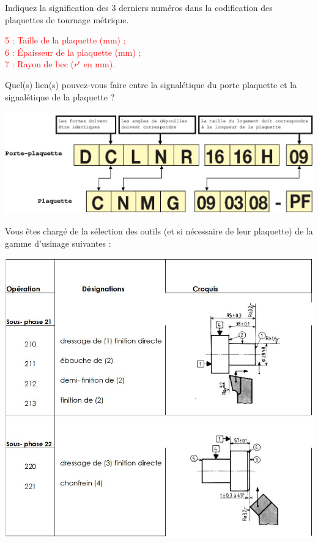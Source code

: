 \documentclass[12pt,a4paper]{article} %
\begin{document}
\begin{exo} Indiquez la signification des 3 derniers numéros dans la codification des plaquettes de tournage métrique. \end{exo}


\textcolor{red}{5 : Taille de la plaquette (mm) ; \\ 6 : Épaisseur de la plaquette (mm) ; \\ 7 : Rayon de bec ($r^{\epsilon}$ en mm).}



\begin{exo} Quel(s) lien(s) pouvez-vous faire entre la signalétique du porte plaquette et la signalétique de la plaquette ?\end{exo}

\includegraphics[width=0.95\linewidth]{CORR8.png}




\begin{tcolorbox}[colback=blue!5!white,colframe=red!75!black]
   \bcdodecaedre Vous êtes chargé de la sélection des outils (et si nécessaire de leur plaquette) de la gamme d'usinage suivantes :
\begin{center}
\includegraphics[width=0.75\linewidth]{G1.JPG}
\end{center}   
  \end{tcolorbox}
\end{document}
